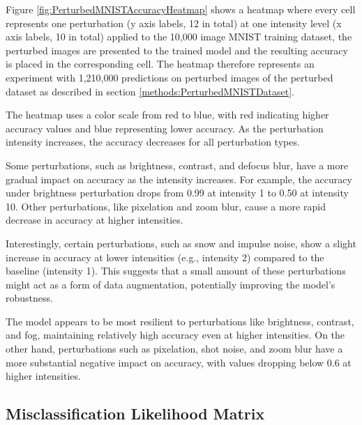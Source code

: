 
Figure \ref{fig:PerturbedMNISTAccuracyHeatmap} shows a heatmap where every cell represents one perturbation (y axis labels, 12 in total) at one intensity level (x axis labels, 10 in total) applied to the 10,000 image MNIST training dataset, the perturbed images are presented to the trained model and the resulting accuracy is placed in the corresponding cell. The heatmap therefore represents an experiment with 1,210,000 predictions on perturbed images of the perturbed dataset as described in section \ref{methods:PerturbedMNISTDataset}.

The heatmap uses a color scale from red to blue, with red indicating higher accuracy values and blue representing lower accuracy. As the perturbation intensity increases, the accuracy decreases for all perturbation types.

Some perturbations, such as brightness, contrast, and defocus blur, have a more gradual impact on accuracy as the intensity increases. For example, the accuracy under brightness perturbation drops from 0.99 at intensity 1 to 0.50 at intensity 10. Other perturbations, like pixelation and zoom blur, cause a more rapid decrease in accuracy at higher intensities.

Interestingly, certain perturbations, such as snow and impulse noise, show a slight increase in accuracy at lower intensities (e.g., intensity 2) compared to the baseline (intensity 1). This suggests that a small amount of these perturbations might act as a form of data augmentation, potentially improving the model's robustness.

The model appears to be most resilient to perturbations like brightness, contrast, and fog, maintaining relatively high accuracy even at higher intensities. On the other hand, perturbations such as pixelation, shot noise, and zoom blur have a more substantial negative impact on accuracy, with values dropping below 0.6 at higher intensities.


\subsection{Misclassification Likelihood Matrix}


